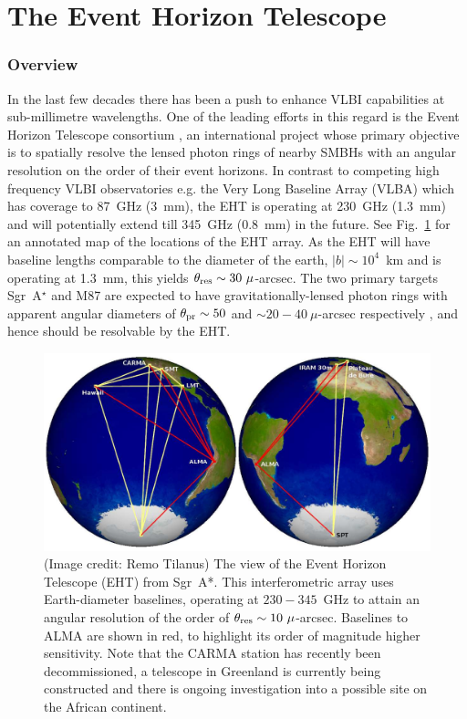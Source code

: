\section{The Event Horizon Telescope}
\subsubsection{Overview}
In the last few decades there has been a push to enhance VLBI capabilities at sub-millimetre wavelengths. One of the leading efforts in this regard is the Event Horizon Telescope consortium \citep[(EHT),][]{Doeleman_2010}, an international project whose primary objective is to spatially resolve the lensed photon rings of nearby SMBHs with an angular resolution on the order of their event horizons. In contrast to competing high frequency VLBI observatories e.g. the Very Long Baseline Array (VLBA) which has coverage to 87~GHz (3~mm), the EHT is operating at 230~GHz (1.3~mm) and will potentially extend till 345~GHz (0.8~mm) in the future. See Fig.~\ref{fig:eht_globe} for an annotated map of the locations of the EHT array. As the EHT will have baseline lengths comparable to the diameter of the earth, $|b| \sim 10^4$~km and is operating at 1.3~mm, this yields $\theta_{\rm res} \sim 30\ \mu$-arcsec.  The two primary targets Sgr~A$^\star$ and M87 are expected to have gravitationally-lensed photon rings with apparent angular diameters of $\theta_{\rm pr} \sim 50$ and $\sim 20-40\ \mu$-arcsec respectively \citep*{Broderick_2009,Falcke_2013}, and hence should be resolvable by the EHT. 
\begin{figure}[h!]
\includegraphics[width=0.8\columnwidth]{Images/eht_globe}
\caption{(Image credit: Remo Tilanus) The view of the Event Horizon Telescope (EHT) from Sgr~A*. This interferometric array uses Earth-diameter baselines, operating at $230-345$~GHz to attain an angular resolution of the order of ${\theta_{\rm res} \sim 10\ \mu}$-arcsec. Baselines to ALMA are shown in red, to highlight its order of magnitude higher sensitivity. Note that the CARMA station has recently been decommissioned, a telescope in Greenland is currently being constructed and there is ongoing investigation into a possible site on the African continent.\label{fig:eht_globe}%
}
\end{figure}



